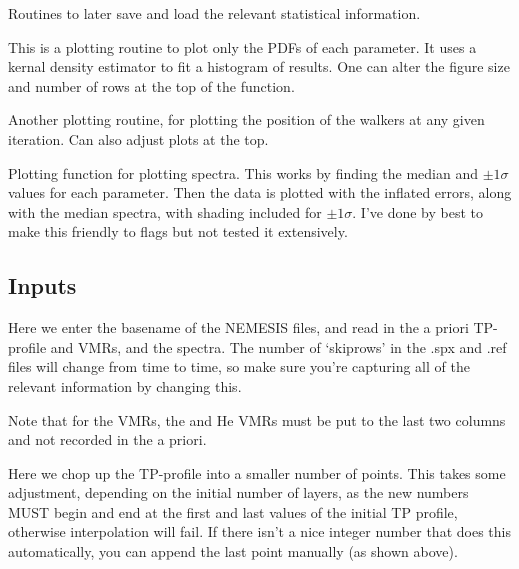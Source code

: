 \documentclass[11pt, a4paper,titlepage]{report}
\begin{document}
Routines to later save and load the relevant statistical information.



This is a plotting routine to plot only the PDFs of each parameter. It uses a kernal density estimator to fit a histogram of results. One can alter the figure size and number of rows at the top of the function. 



Another plotting routine, for plotting the position of the walkers at any given iteration. Can also adjust plots at the top.



Plotting function for plotting spectra. This works by finding the median and $\pm 1 \sigma$ values for each parameter. Then the data is plotted with the inflated errors, along with the median spectra, with shading included for $\pm 1 \sigma$. I've done by best to make this friendly to flags but not tested it extensively. 

\subsection{Inputs}



Here we enter the basename of the NEMESIS files, and read in the a priori TP-profile and VMRs, and the spectra. The number of `skiprows' in the .spx and .ref files will change from time to time, so make sure you're capturing all of the relevant information by changing this. 

Note that for the VMRs, the  and He VMRs must be put to the last two columns and not recorded in the a priori.



Here we chop up the TP-profile into a smaller number of points. This takes some adjustment, depending on the initial number of layers, as the new numbers MUST begin and end at the first and last values of the initial TP profile, otherwise interpolation will fail. If there isn't a nice integer number that does this automatically, you can append the last point manually (as shown above). 
\end{document}
